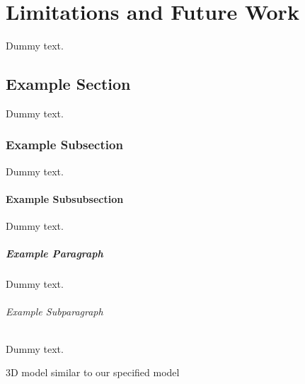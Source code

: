 \chapter{Limitations and Future Work}

Dummy text.

\section{Example Section}

Dummy text.

\subsection{Example Subsection}

Dummy text.

\subsubsection{Example Subsubsection}

Dummy text.

\paragraph{Example Paragraph}

Dummy text.

\subparagraph{Example Subparagraph}

Dummy text.


3D model similar to our specified model
